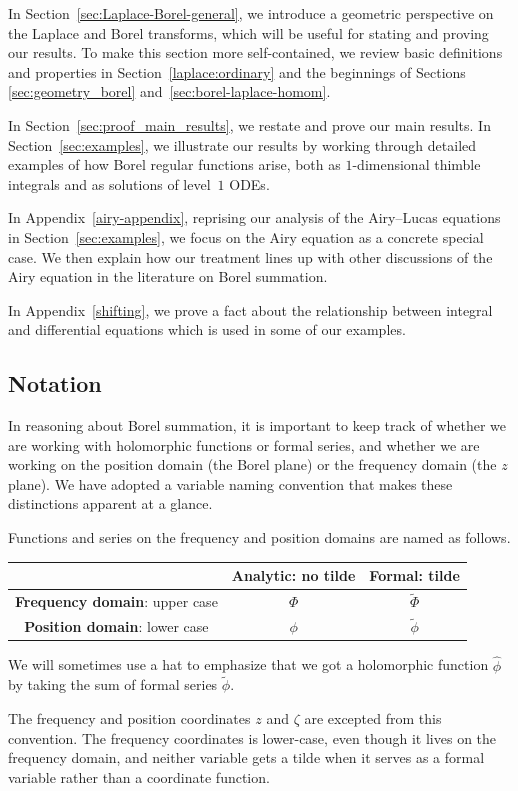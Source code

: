 \documentclass[pdftex]{sigma}
\newcommand{\series}[1]{\tilde{#1}}
\numberwithin{equation}{section}
\begin{document}
In Section~\ref{sec:Laplace-Borel-general}, we introduce a geometric perspective on the Laplace and Borel transforms, which will be useful for stating and proving our results. To make this section more self-contained, we review basic definitions and properties in Section~\ref{laplace:ordinary} and the beginnings of Sections \ref{sec:geometry_borel} and~\ref{sec:borel-laplace-homom}.

In Section~\ref{sec:proof_main_results}, we restate and prove our main results. In Section~\ref{sec:examples}, we illustrate our results by working through detailed examples of how Borel regular functions arise, both as $1$-dimensional thimble integrals and as solutions of level~$1$ ODEs.

In Appendix~\ref{airy-appendix}, reprising our analysis of the Airy--Lucas equations in Section~\ref{sec:examples}, we focus on the Airy equation as a concrete special case. We then explain how our treatment lines up with other discussions of the Airy equation in the literature on Borel summation.

In Appendix~\ref{shifting}, we prove a fact about the relationship between integral and differential equations which is used in some of our examples.

\subsection{Notation}
In reasoning about Borel summation, it is important to keep track of whether we are working with holomorphic functions or formal series, and whether we are working on the position domain (the Borel plane) or the frequency domain (the $z$ plane). We have adopted a variable naming convention that makes these distinctions apparent at a glance.
\begin{notation*}
Functions and series on the frequency and position domains are named as follows.
\begin{center}
\begin{tabular}{c|c|c}
& \textbf{Analytic}: no tilde & \textbf{Formal}: tilde \\[1mm] \hline
\vphantom{\rule{0mm}{5mm}} \textbf{Frequency domain}: upper case & $\Phi$ & $\series{\Phi}$ \\[1mm] \hline
\vphantom{\rule{0mm}{5mm}} \textbf{Position domain}: lower case & $\phi$ & $\series{\phi}$ \\[1mm]
\end{tabular}
\end{center}
We will sometimes use a hat to emphasize that we got a holomorphic function $\hat{\phi}$ by taking the sum of formal series $\series{\phi}$.

The frequency and position coordinates $z$ and $\zeta$ are excepted from this convention. The frequency coordinates is lower-case, even though it lives on the frequency domain, and neither variable gets a tilde when it serves as a formal variable rather than a coordinate function.
\end{notation*}
\end{document}
